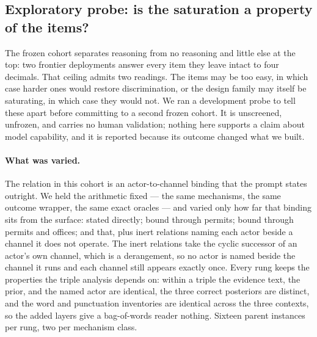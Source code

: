 

\subsection{Exploratory probe: is the saturation a property of the items?}
\label{app:exp1-ladder}

The frozen cohort separates reasoning from no reasoning and little else at the
top: two frontier deployments answer every item they leave intact to four
decimals. That ceiling admits two readings. The items may be too easy, in which
case harder ones would restore discrimination, or the design family may itself
be saturating, in which case they would not. We ran a development probe to tell
these apart before committing to a second frozen cohort. It is unscreened,
unfrozen, and carries no human validation; nothing here supports a claim about
model capability, and it is reported because its outcome changed what we built.

\paragraph{What was varied.} The relation in this cohort is an actor-to-channel
binding that the prompt states outright. We held the arithmetic fixed --- the
same mechanisms, the same outcome wrapper, the same exact oracles --- and varied
only how far that binding sits from the surface: stated directly; bound through
permits; bound through permits and offices; and that, plus inert relations naming
each actor beside a channel it does not operate. The inert relations take the
cyclic successor of an actor's own channel, which is a derangement, so no actor
is named beside the channel it runs and each channel still appears exactly once.
Every rung keeps the properties the triple analysis depends on: within a triple
the evidence text, the prior, and the named actor are identical, the three
correct posteriors are distinct, and the word and punctuation inventories are
identical across the three contexts, so the added layers give a bag-of-words
reader nothing. Sixteen parent instances per rung, two per mechanism class.

